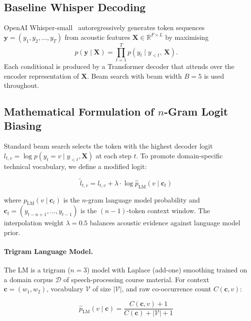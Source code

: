 \documentclass[10pt,twocolumn]{article}
\begin{document}
\subsection{Baseline Whisper Decoding}

OpenAI Whisper-small~\cite{radford2023robust} autoregressively generates token sequences $\mathbf{y} = (y_1, y_2, \ldots, y_T)$ from acoustic features $\mathbf{X} \in \mathbb{R}^{F \times L}$ by maximising
\[
p(\mathbf{y} \mid \mathbf{X}) = \prod_{t=1}^{T} p(y_t \mid y_{<t},\, \mathbf{X}).
\]
Each conditional is produced by a Transformer decoder that attends over the encoder representation of $\mathbf{X}$. Beam search with beam width $B=5$ is used throughout.

\subsection{Mathematical Formulation of $n$-Gram Logit Biasing}

Standard beam search selects the token with the highest decoder logit $l_{t,v} = \log p(y_t = v \mid y_{<t}, \mathbf{X})$ at each step $t$. To promote domain-specific technical vocabulary, we define a modified logit:

\begin{equation}
\tilde{l}_{t,v} = l_{t,v} + \lambda \cdot \log \hat{p}_{\text{LM}}(v \mid \mathbf{c}_t)
\label{eq:biasing}
\end{equation}

where $\hat{p}_{\text{LM}}(v \mid \mathbf{c}_t)$ is the $n$-gram language model probability and $\mathbf{c}_t = (y_{t-n+1}, \ldots, y_{t-1})$ is the $(n{-}1)$-token context window. The interpolation weight $\lambda = 0.5$ balances acoustic evidence against language model prior.

\paragraph{Trigram Language Model.}  
The LM is a trigram ($n=3$) model with Laplace (add-one) smoothing trained on a domain corpus $\mathcal{D}$ of speech-processing course material. For context $\mathbf{c} = (w_1, w_2)$, vocabulary $\mathcal{V}$ of size $|\mathcal{V}|$, and raw co-occurrence count $C(\mathbf{c}, v)$:

\begin{equation}
\hat{p}_{\text{LM}}(v \mid \mathbf{c}) = \frac{C(\mathbf{c}, v) + 1}{C(\mathbf{c}) + |\mathcal{V}| + 1}
\label{eq:laplace}
\end{equation}
\end{document}
